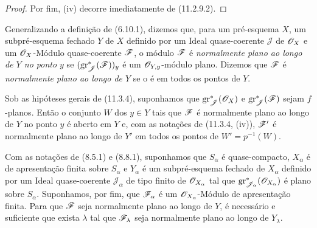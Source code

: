 \begin{proof}
Por fim, (iv) decorre imediatamente de (11.2.9.2).
\end{proof}

Generalizando a definição de (6.10.1), dizemos que, para um
pré-esquema $X$, um subpré-esquema fechado $Y$ de $X$ definido
por um Ideal quase-coerente $\mathcal J$ de $\mathscr{O}_X$ e um
$\mathscr{O}_X$-Módulo quase-coerente $\mathscr{F}$, o módulo $\mathscr{F}$
é \emph{normalmente plano ao longo de $Y$ no ponto $y$} se
$(\operatorname{gr}_{\mathscr J}^*(\mathscr{F}))_y$ é um
$\mathscr{O}_{Y,y}$-módulo plano. Dizemos que $\mathscr{F}$ é
\emph{normalmente plano ao longo de $Y$} se o é em todos os
pontos de $Y$.

\begin{corollary}[11.3.5]
\label{IV.11.3.5}
Sob as hipóteses gerais de (11.3.4), suponhamos que
$\operatorname{gr}_{\mathscr J}^*(\mathscr{O}_X)$ e
$\operatorname{gr}_{\mathscr J}^*(\mathscr{F})$ sejam $f$-planos.
Então o conjunto $W$ dos $y\in Y$ tais que $\mathscr{F}$ é
normalmente plano ao longo de $Y$ no ponto $y$ é aberto em
$Y$ e, com as notações de (11.3.4, (iv)), $\mathscr{F}'$ é
normalmente plano ao longo de $Y'$ em todos os pontos de
$W'=p^{-1}(W)$.
\end{corollary}

\begin{proposition}[11.3.6]
\label{IV.11.3.6}
Com as notações de (8.5.1) e (8.8.1), suponhamos que
$S_\alpha$ é quase-compacto, $X_\alpha$ é de apresentação
finita sobre $S_\alpha$ e $Y_\alpha$ é um subpré-esquema fechado
de $X_\alpha$ definido por um Ideal quase-coerente
$\mathcal J_\alpha$ de tipo finito de $\mathscr{O}_{X_\alpha}$
tal que $\operatorname{gr}_{\mathscr J_\alpha}^*
(\mathscr{O}_{X_\alpha})$ é plano sobre $S_\alpha$.
Suponhamos, por fim, que $\mathscr{F}_\alpha$ é um
$\mathscr{O}_{X_\alpha}$-Módulo de apresentação finita.
Para que $\mathscr{F}$ seja normalmente plano ao longo de $Y$,
é necessário e suficiente que exista $\lambda$ tal que
$\mathscr{F}_\lambda$ seja normalmente plano ao longo de
$Y_\lambda$.
\end{proposition}

